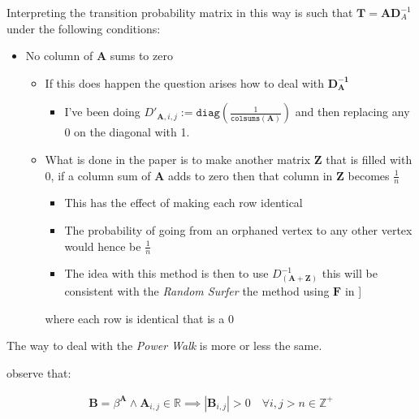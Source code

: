 \documentclass[11pt]{article}
\begin{document}
Interpreting the transition probability matrix in this way is such that
\(\mathbf{T}= \mathbf{A}\mathbf{D}^{- 1}_A\) under the following
conditions:

\begin{itemize}
\item No column of \(\mathbf{A}\) sums to zero

\begin{itemize}
\item If this does happen the question arises how to deal with
\(\mathbf{D_\mathbf{A}^{- 1}}\)

\begin{itemize}
\item I've been doing
\(D'_{\mathbf{A}, i, j} := \mathtt{diag} \left( {\frac{1}{\mathtt{colsums}\left( \mathbf{A} \right)}} \right)\)
and then replacing any \(0\) on the diagonal with 1.
\end{itemize}

\item What is done in the paper is to make another matrix \(\mathbf{Z}\)
that is filled with 0, if a column sum of \(\mathbf{A}\) adds to zero
then that column in \(\mathbf{Z}\) becomes \(\frac{1}{n}\)

\begin{itemize}
\item This has the effect of making each row identical

\item The probability of going from an orphaned vertex to any other
vertex would hence be \(\frac{1}{n}\)

\item The idea with this method is then to use
\(D_\mathbf{\left( A+Z \right)}^{- 1}\) this will be consistent with
the \emph{Random Surfer} the method using \(\mathbf{F}\) in
]
\end{itemize}

where each row is identical that is a 0
\end{itemize}
\end{itemize}

The way to deal with the \emph{Power Walk} is more or less the same.

observe that:

$$\begin{aligned}
    \mathbf{B} = \beta^{\mathbf{A}} \wedge \mathbf{A}_{i, j}\in \mathbb{R}  \implies  \left\lvert \mathbf{B}_{i, j} \right\rvert > 0 \quad \forall i,j>n\in \mathbb{Z}^+ \label{eq:b-is-pos}\end{aligned}$$
\end{document}
